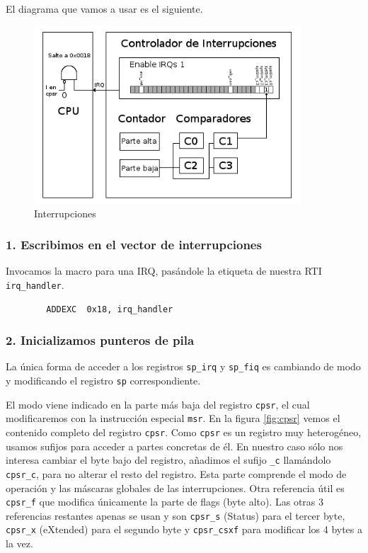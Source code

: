 El diagrama que vamos a usar es el siguiente.

\begin{figure}[h]
  \centering
    \includegraphics[width=10cm]{graphs/inter1.png}
  \caption{Interrupciones}
  \label{fig:inter1}
\end{figure}

\subsubsection{1. Escribimos en el vector de interrupciones}

  Invocamos la macro para una IRQ, pasándole la etiqueta de nuestra RTI {\tt irq\_handler}.
\begin{lstlisting}
        ADDEXC  0x18, irq_handler
\end{lstlisting}

\subsubsection{2. Inicializamos punteros de pila}

La única forma de acceder a los registros {\tt sp\_irq} y {\tt sp\_fiq} es cambiando de modo
 y modificando el registro {\tt sp} correspondiente.

El modo viene indicado en la parte más baja del registro {\tt cpsr}, el cual modificaremos
con la instrucción especial {\tt msr}. En la figura \ref{fig:cpsr} vemos el contenido completo
del registro {\tt cpsr}. Como {\tt cpsr} es un registro muy heterogéneo, usamos
sufijos para acceder a partes concretas de él. En nuestro caso sólo nos
interesa cambiar el byte bajo del registro, añadimos el sufijo {\tt \_c} llamándolo {\tt cpsr\_c},
para no alterar el resto del registro. Esta parte comprende el modo de operación
y las máscaras globales de las interrupciones. Otra referencia útil es {\tt cpsr\_f} que modifica
únicamente la parte de flags (byte alto). Las otras 3 referencias restantes apenas se usan y
son {\tt cpsr\_s} (Status) para el tercer byte, {\tt cpsr\_x} (eXtended) para el segundo byte y
{\tt cpsr\_csxf} para modificar los 4 bytes a la vez.


